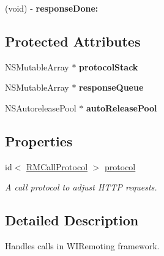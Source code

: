 \begin{DoxyCompactItemize}
\item 
\hypertarget{interface_r_m_call_ad886fa1609a87c68a5d681942704e61d}{
(void) -\/ {\bfseries responseDone:}}
\label{interface_r_m_call_ad886fa1609a87c68a5d681942704e61d}

\end{DoxyCompactItemize}
\subsection*{Protected Attributes}
\begin{DoxyCompactItemize}
\item 
\hypertarget{interface_r_m_call_af082e641c263aa410c5195084153e03b}{
NSMutableArray $\ast$ {\bfseries protocolStack}}
\label{interface_r_m_call_af082e641c263aa410c5195084153e03b}

\item 
\hypertarget{interface_r_m_call_ab5d202e25515a602bac16ab028336a89}{
NSMutableArray $\ast$ {\bfseries responseQueue}}
\label{interface_r_m_call_ab5d202e25515a602bac16ab028336a89}

\item 
\hypertarget{interface_r_m_call_a98a195cf89cf282dc613f6573c238d2d}{
NSAutoreleasePool $\ast$ {\bfseries autoReleasePool}}
\label{interface_r_m_call_a98a195cf89cf282dc613f6573c238d2d}

\end{DoxyCompactItemize}
\subsection*{Properties}
\begin{DoxyCompactItemize}
\item 
\hypertarget{interface_r_m_call_ae96906f15a63ea2680d57eccef568944}{
id$<$ \hyperlink{protocol_r_m_call_protocol-p}{RMCallProtocol} $>$ \hyperlink{interface_r_m_call_ae96906f15a63ea2680d57eccef568944}{protocol}}
\label{interface_r_m_call_ae96906f15a63ea2680d57eccef568944}

\begin{DoxyCompactList}\small\item\em A call protocol to adjust HTTP requests. \item\end{DoxyCompactList}\end{DoxyCompactItemize}


\subsection{Detailed Description}
Handles calls in WIRemoting framework. 

